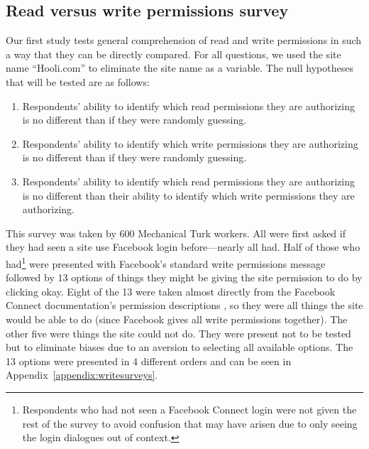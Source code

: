\documentclass[10pt]{sig-alternate-10pt}
\begin{document}
\subsection{Read versus write permissions survey}
\label{sec:comparisonsurvey}

Our first study tests general comprehension of read and write permissions in such a way that they can be directly compared. For all questions, we used the site name ``Hooli.com'' to eliminate the site name as a variable. The null hypotheses that will be tested are as follows:

\begin{enumerate}
  \item Respondents' ability to identify which read permissions they are authorizing is no different than if they were randomly guessing.
  \item Respondents' ability to identify which write permissions they are authorizing is no different than if they were randomly guessing.
  \item Respondents' ability to identify which read permissions they are authorizing is no different than their ability to identify which write permissions they are authorizing.
\end{enumerate}

This survey was taken by 600 Mechanical Turk workers. All were first asked if they had seen a site use Facebook login before---nearly all had. Half of those who had\footnote{Respondents who had not seen a Facebook Connect login were not given the rest of the survey to avoid confusion that may have arisen due to only seeing the login dialogues out of context.} were presented with Facebook's standard write permissions message followed by 13 options of things they might be giving the site permission to do by clicking okay. Eight of the 13 were taken almost directly from the Facebook Connect documentation's permission descriptions \cite{fbpermissions}, so they were all things the site would be able to do (since Facebook gives all write permissions together). The other five were things the site could not do. They were present not to be tested but to eliminate biases due to an aversion to selecting all available options. The 13 options were presented in 4 different orders and can be seen in Appendix~\ref{appendix:writesurveys}. 
\end{document}

